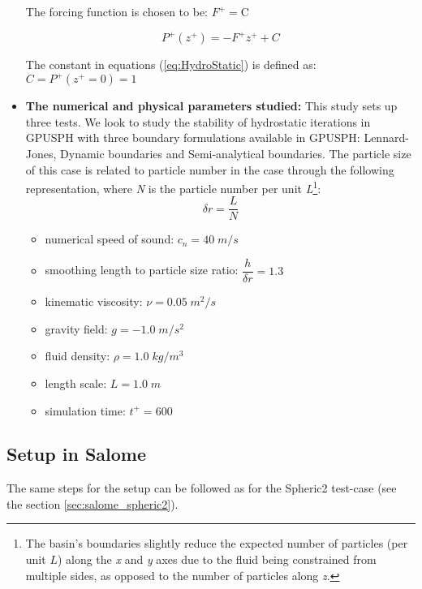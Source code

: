 \documentclass{../GPUSPHtemplate}
\begin{document}
\begin{itemize}
  The forcing function is chosen to be: $ F^+ = \text{C}  $  
    
  \begin{equation}\label{eq:HydroStatic}
    P^+(z^+) =  -F^{+} z^+  + C
  \end{equation}
  
  The constant in equations (\ref{eq:HydroStatic}) is defined as:\\
  $C = P^+(z^+ = 0) = 1$
  
\item \textbf{The numerical and physical parameters studied:} This study sets up three tests.
  We look to study the stability of hydrostatic iterations in GPUSPH with three boundary formulations available in GPUSPH:
  Lennard-Jones, Dynamic boundaries and Semi-analytical boundaries.
  The particle size of this case is related to particle number in the case through the following representation,
  where \textit{N} is the particle number per unit
  \textit{L}\footnote{The basin's boundaries slightly reduce the expected number of particles (per unit $L$)
    along the \textit{x} and \textit{y} axes due to the fluid being constrained from multiple sides,
    as opposed to the number of particles along \textit{z}. }:
  \begin{equation}
    \delta r = \frac{L}{N} 
  \end{equation}            
  
  \begin{itemize}
  \item numerical speed of sound: ${c_n} = 40 \; m/s$
  \item smoothing length to particle size ratio: $\dfrac{h}{\delta r}=1.3$ 
  \item kinematic viscosity: $\nu = 0.05 \; {m^2}/{s}$
  \item gravity field: $g = -1.0 \; {m}/{s^2}$
  \item fluid density: $\rho = 1.0 \; {kg}/{m^3} $
  \item length scale: $L = 1.0 \; m$
  \item simulation time: $t^+ = 600 $ 
  \end{itemize}
\end{itemize}

\subsection{Setup in Salome}

The same steps for the setup can be followed as for the Spheric2 test-case (see the section \ref{sec:salome_spheric2}).
\end{document}
